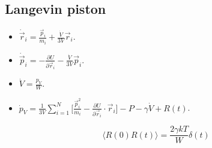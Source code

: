 	\subsection{Langevin piston}

	\begin{itemize}
		\item $\dot{\vec{r}}_i = \frac{\vec{p}_i}{m_i} + \frac{\dot{V}}{3V}\vec{r}_i$.
		\item $\dot{\vec{p}}_i = -\frac{\partial U}{\partial\vec{r}_i}-\frac{\dot{V}}{3V}\vec{p}_i$.
		\item $\dot{V} = \frac{p_V}{W}$.
		\item $\dot{p}_V = \frac{1}{3V}\sum\limits_{i=1}^N\biggl[\frac{\vec{p}_i^2}{m_i}-\frac{\partial U}{\partial\vec{r}_i}\cdot\vec{r}_i\biggr]-P-\gamma\dot{V}+R(t)$.
	\end{itemize}

	$$\langle R(0)R(t)\rangle = \frac{2\gamma kT}{W}\delta(t)$$

